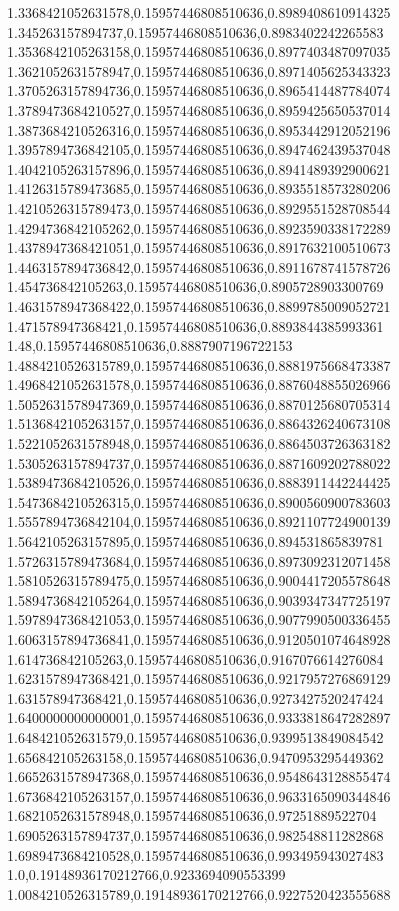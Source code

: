 1.3368421052631578,0.15957446808510636,0.8989408610914325
1.345263157894737,0.15957446808510636,0.8983402242265583
1.3536842105263158,0.15957446808510636,0.8977403487097035
1.3621052631578947,0.15957446808510636,0.8971405625343323
1.3705263157894736,0.15957446808510636,0.8965414487784074
1.3789473684210527,0.15957446808510636,0.8959425650537014
1.3873684210526316,0.15957446808510636,0.8953442912052196
1.3957894736842105,0.15957446808510636,0.8947462439537048
1.4042105263157896,0.15957446808510636,0.8941489392900621
1.4126315789473685,0.15957446808510636,0.8935518573280206
1.4210526315789473,0.15957446808510636,0.8929551528708544
1.4294736842105262,0.15957446808510636,0.8923590338172289
1.4378947368421051,0.15957446808510636,0.8917632100510673
1.4463157894736842,0.15957446808510636,0.8911678741578726
1.454736842105263,0.15957446808510636,0.8905728903300769
1.4631578947368422,0.15957446808510636,0.8899785009052721
1.471578947368421,0.15957446808510636,0.8893844385993361
1.48,0.15957446808510636,0.8887907196722153
1.4884210526315789,0.15957446808510636,0.8881975668473387
1.4968421052631578,0.15957446808510636,0.8876048855026966
1.5052631578947369,0.15957446808510636,0.8870125680705314
1.5136842105263157,0.15957446808510636,0.8864326240673108
1.5221052631578948,0.15957446808510636,0.8864503726363182
1.5305263157894737,0.15957446808510636,0.8871609202788022
1.5389473684210526,0.15957446808510636,0.8883911442244425
1.5473684210526315,0.15957446808510636,0.8900560900783603
1.5557894736842104,0.15957446808510636,0.8921107724900139
1.5642105263157895,0.15957446808510636,0.894531865839781
1.5726315789473684,0.15957446808510636,0.8973092312071458
1.5810526315789475,0.15957446808510636,0.9004417205578648
1.5894736842105264,0.15957446808510636,0.9039347347725197
1.5978947368421053,0.15957446808510636,0.9077990500336455
1.6063157894736841,0.15957446808510636,0.9120501074648928
1.614736842105263,0.15957446808510636,0.9167076614276084
1.6231578947368421,0.15957446808510636,0.9217957276869129
1.631578947368421,0.15957446808510636,0.9273427520247424
1.6400000000000001,0.15957446808510636,0.9333818647282897
1.648421052631579,0.15957446808510636,0.9399513849084542
1.656842105263158,0.15957446808510636,0.9470953295449362
1.6652631578947368,0.15957446808510636,0.9548643128855474
1.6736842105263157,0.15957446808510636,0.9633165090344846
1.6821052631578948,0.15957446808510636,0.97251889522704
1.6905263157894737,0.15957446808510636,0.982548811282868
1.6989473684210528,0.15957446808510636,0.993495943027483
1.0,0.19148936170212766,0.9233694090553399
1.0084210526315789,0.19148936170212766,0.9227520423555688
